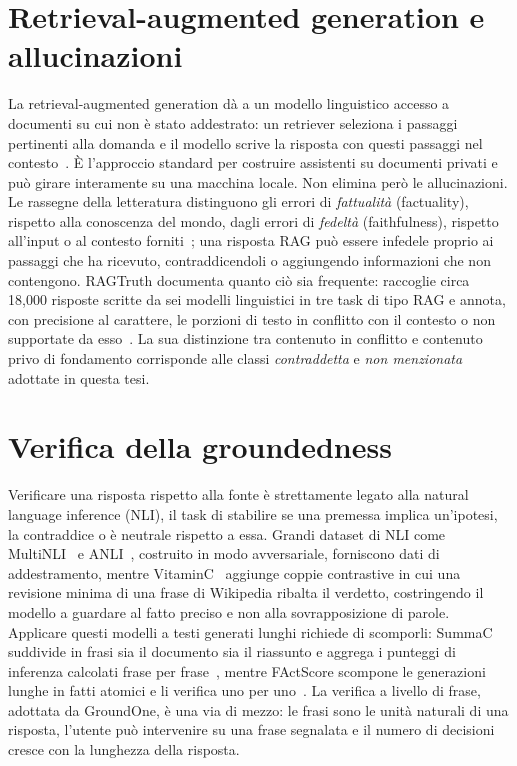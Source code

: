 \section{Retrieval-augmented generation e allucinazioni}
\label{sec:bg-rag}

La retrieval-augmented generation dà a un modello linguistico accesso a documenti su cui non è stato addestrato: un
retriever seleziona i passaggi pertinenti alla domanda e il modello scrive la risposta con questi passaggi nel
contesto~\cite{lewis2020rag}. È l'approccio standard per costruire assistenti su documenti privati e può girare
interamente su una macchina locale. Non elimina però le allucinazioni. Le rassegne della letteratura distinguono gli
errori di \emph{fattualità} (factuality), rispetto alla conoscenza del mondo, dagli errori di \emph{fedeltà}
(faithfulness), rispetto all'input o al contesto forniti~\cite{huang2025hallucination}; una risposta RAG può essere
infedele proprio ai passaggi che ha ricevuto, contraddicendoli o aggiungendo informazioni che non contengono. RAGTruth
documenta quanto ciò sia frequente: raccoglie circa 18{,}000 risposte scritte da sei modelli linguistici in tre task
di tipo RAG e annota, con precisione al carattere, le porzioni di testo in conflitto con il contesto o non supportate da
esso~\cite{niu2024ragtruth}. La sua distinzione tra contenuto in conflitto e contenuto privo di fondamento corrisponde
alle classi \emph{contraddetta} e \emph{non menzionata} adottate in questa tesi.

\section{Verifica della groundedness}
\label{sec:bg-verification}

Verificare una risposta rispetto alla fonte è strettamente legato alla natural language inference (NLI), il task di
stabilire se una premessa implica un'ipotesi, la contraddice o è neutrale rispetto a essa. Grandi dataset di NLI come
MultiNLI~\cite{williams2018mnli} e ANLI~\cite{nie2020anli}, costruito in modo avversariale, forniscono dati di
addestramento, mentre VitaminC~\cite{schuster2021vitaminc} aggiunge coppie contrastive in cui una revisione minima di una
frase di Wikipedia ribalta il verdetto, costringendo il modello a guardare al fatto preciso e non alla sovrapposizione di
parole. Applicare questi modelli a testi generati lunghi richiede di scomporli: SummaC suddivide in frasi sia il
documento sia il riassunto e aggrega i punteggi di inferenza calcolati frase per frase~\cite{laban2022summac}, mentre
FActScore scompone le generazioni lunghe in fatti atomici e li verifica uno per uno~\cite{min2023factscore}. La verifica a
livello di frase, adottata da GroundOne, è una via di mezzo: le frasi sono le unità naturali di una risposta, l'utente può
intervenire su una frase segnalata e il numero di decisioni cresce con la lunghezza della risposta.

